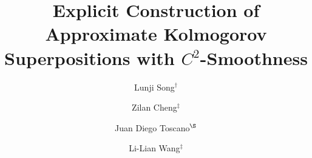 \documentclass[10pt,reqno,final]{amsart}
\theoremstyle{remark}
\theoremstyle{definition}
\begin{document}

\baselineskip 13pt

\title[Approximate Kolmogorov Superpositions] {Explicit  Construction of Approximate Kolmogorov Superpositions with $C^2$-Smoothness}

\author[Approximate Kolmogorov  Superpositions]{Lunji Song$^\dagger$}
\address{${}^\dagger$\rm School of Mathematics and Statistics, Lanzhou University, Lanzhou 730000, China. The research of the first author is partially supported by the National Natural Science Foundation of China (Grant No. 12171216). Email: song@lzu.edu.cn.}

\author{Zilan Cheng$^\ddagger$}
\address{$^\ddagger$\rm Division of Mathematical Sciences, School of Physical and Mathematical Sciences, Nanyang Technological University, 637371, Singapore. Email: zilan001@e.ntu.edu.sg.}
\author{Juan Diego Toscano$^\S$}
\address{${}^\S$\rm Division of Applied Mathematics, Brown University, Providence, 02912, RI, USA.}

\author{Li-Lian Wang$^\ddagger$}
\address{$^\ddagger$\rm Division of Mathematical Sciences, School of Physical and Mathematical Sciences, Nanyang Technological University, 637371, Singapore. The research of the second and the fourth authors is partially supported by  Singapore MOE AcRF Tier 2 Grant: MOE-T2EP20224-0012. Email: lilian@ntu.edu.sg.}






 
\end{document}
